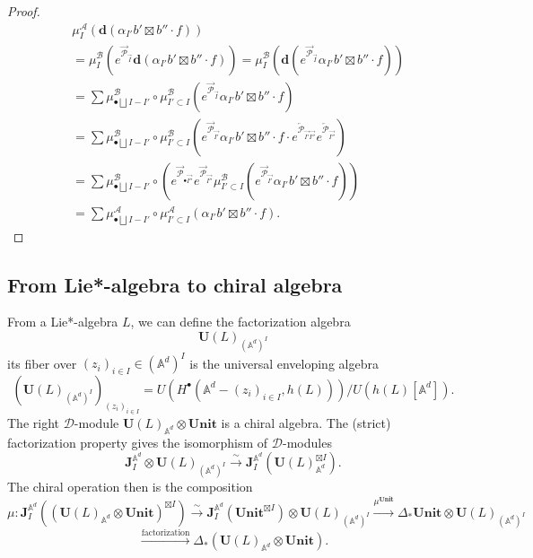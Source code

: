 \documentclass[11pt]{amsart}
\theoremstyle{definition}
\theoremstyle{remark}
\numberwithin{equation}{section}
\begin{document}
\begin{proof}
\begin{align*}
&\mu^{\mathcal{A}}_{ I}\left(\mathbf{d}(\alpha_{ I'}b'\boxtimes b''\cdot f)\right)\\
&=\mu^{\mathcal{B}}_{ I}\left(e^{\overrightarrow{\mathcal{P}}_{\overrightarrow{I}}}\mathbf{d}(\alpha_{ I'}b'\boxtimes b''\cdot f)\right)=\mu^{\mathcal{B}}_{ I}\left(\mathbf{d}(e^{\overrightarrow{\mathcal{P}}_{\overrightarrow{I}}}\alpha_{ I'}b'\boxtimes b''\cdot f)\right)\\
&=\sum \mu^{\mathcal{B}}_{\bullet\bigsqcup  I- I'}\circ \mu^{\mathcal{B}}_{ I'\subset  I}\left(e^{\overrightarrow{\mathcal{P}}_{\overrightarrow{I}}}\alpha_{ I'}b'\boxtimes b''\cdot f\right)\\
&=\sum \mu^{\mathcal{B}}_{\bullet\bigsqcup  I- I'}\circ \mu^{\mathcal{B}}_{ I'\subset  I}\left(e^{\overrightarrow{\mathcal{P}}_{\overrightarrow{I'}}}\alpha_{ I'}b'\boxtimes b''\cdot f\cdot e^{\overleftarrow{\mathcal{P}}_{\overrightarrow{I'}\overrightarrow{I''}}}e^{\overleftarrow{\mathcal{P}}_{\overrightarrow{I''}}}\right)\\
&=\sum \mu^{\mathcal{B}}_{\bullet\bigsqcup  I- I'}\circ \left(e^{\overrightarrow{\mathcal{P}}_{\bullet\overrightarrow{I''}}}e^{\overrightarrow{\mathcal{P}}_{\overrightarrow{I''}}} \mu^{\mathcal{B}}_{ I'\subset  I}(e^{\overrightarrow{\mathcal{P}}_{\overrightarrow{I'}}}\alpha_{ I'}b'\boxtimes b''\cdot f)\right)\\
&=\sum \mu^{\mathcal{A}}_{\bullet\bigsqcup  I- I'}\circ \mu^{\mathcal{A}}_{ I'\subset  I}\left(\alpha_{ I'}b'\boxtimes b''\cdot f\right).
\end{align*}


 \end{proof}
\subsection{From Lie*-algebra to chiral algebra}
From a Lie*-algebra $L$, we can define the factorization algebra
$$
\mathbf{U}(L)_{(\mathbb{A}^d)^{ I}}
$$
its fiber over $(z_i)_{i\in I}\in (\mathbb{A}^d)^{ I}$ is the universal enveloping algebra
$$
\left(\mathbf{U}(L)_{(\mathbb{A}^d)^{ I}}\right)_{(z_i)_{i\in I}}=U\left(H^{\bullet}(\mathbb{A}^d-(z_i)_{i\in I},h(L))\right)/U\left(h(L)[\mathbb{A}^d]\right).
$$
The right $\mathcal{D}$-module $\mathbf{U}(L)_{\mathbb{A}^d}\otimes \mathbf{Unit}$ is a chiral algebra. The (strict) factorization property gives the isomorphism of $\mathcal{D}$-modules
$$ \mathbf{J}^{\mathbb{A}^d}_{ I}\otimes \mathbf{U}(L)_{(\mathbb{A}^d)^{ I}}\xrightarrow{\sim}\mathbf{J}^{\mathbb{A}^d}_{ I}\left(\mathbf{U}(L)_{\mathbb{A}^d}^{\boxtimes I}\right).
$$
The chiral operation then is the composition
$$
\mu:\mathbf{J}^{\mathbb{A}^d}_{ I}\left((\mathbf{U}(L)_{\mathbb{A}^d}\otimes \mathbf{Unit})^{\boxtimes I}\right)\xrightarrow{\sim} \mathbf{J}^{\mathbb{A}^d}_{ I}(\mathbf{Unit}^{\boxtimes I})\otimes \mathbf{U}(L)_{(\mathbb{A}^d)^{ I}}\xrightarrow{\mu^{\mathbf{Unit}}}\Delta_*\mathbf{Unit}\otimes \mathbf{U}(L)_{(\mathbb{A}^d)^{ I}}
$$
$$
\xrightarrow{\text{factorization}}\Delta_*\left(\mathbf{U}(L)_{\mathbb{A}^d}\otimes \mathbf{Unit}\right).
$$
\end{document}
